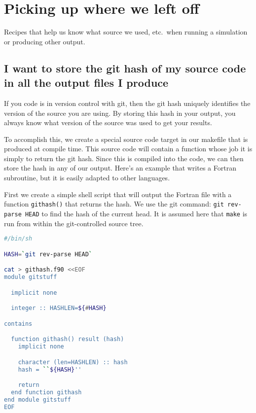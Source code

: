 \section{Picking up where we left off}

Recipes that help us know what source we used, etc.\ when running
a simulation or producing other output.


\subsection{I want to store the git hash of my source code in all the output files I produce}

If you code is in version control with git, then the git hash uniquely
identifies the version of the source you are using.  By storing this
hash in your output, you always know what version of the source was
used to get your results.

To accomplish this, we create a special source code target in our
makefile that is produced at compile time.  This source code will
contain a function whose job it is simply to return the git hash.
Since this is compiled into the code, we can then store the hash in
any of our output.  Here's an example that writes a Fortran
subroutine, but it is easily adapted to other languages.

First we create a simple shell script that will output the
Fortran file with a function {\tt githash()} that returns
the hash.  We use the git command: {\tt git rev-parse HEAD}
to find the hash of the current head.  It is assumed here
that {\tt make} is run from within the git-controlled
source tree.

\begin{lstlisting}[language={bash},upquote=true]
#/bin/sh

HASH=`git rev-parse HEAD`

cat > githash.f90 <<EOF
module gitstuff

  implicit none

  integer :: HASHLEN=${#HASH}

contains

  function githash() result (hash)
    implicit none

    character (len=HASHLEN) :: hash
    hash = ``${HASH}''

    return
  end function githash
end module gitstuff
EOF  
\end{lstlisting}


